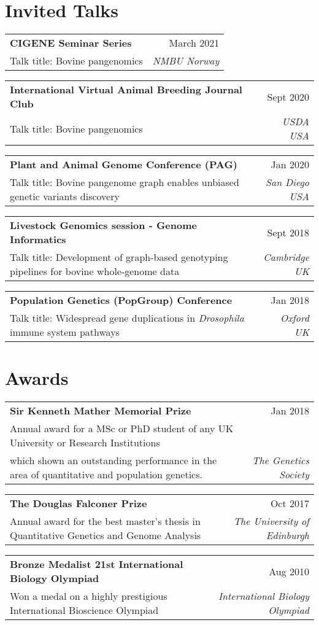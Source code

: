 \documentclass[letterpaper,10pt]{article}
\makeatletter
\newcommand{\resumetalk}[4]{\small{
  \vspace{-2pt}\item
    \begin{tabular*}{0.97\textwidth}[t]{l@{\extracolsep{\fill}}r}
      \textbf{#1} & #2 \\
      \small#3 & \textit{\small #4} \\
    \end{tabular*}\vspace{-4pt}
    }
}
\newcommand{\resumeSubHeadingListStart}{\begin{itemize}[leftmargin=0.15in, label={}]}
\newcommand{\resumeSubHeadingListEnd}{\end{itemize}}
\makeatother
\begin{document}
\section{Invited Talks}
   
 \resumeSubHeadingListStart
 \small{
 
    \resumetalk {CIGENE Seminar Series}{March 2021}
      {Talk title: Bovine pangenomics}{NMBU Norway}
      \resumetalk {International Virtual Animal Breeding Journal Club}{Sept 2020}
      {Talk title: Bovine pangenomics}{USDA USA}
   \resumetalk {Plant and Animal Genome Conference (PAG)}{Jan 2020}
      {Talk title: Bovine pangenome graph enables unbiased genetic variants discovery}{San Diego USA}
      
  \resumetalk {Livestock Genomics session - Genome Informatics}{Sept 2018}
     {Talk title: Development of graph-based genotyping pipelines for bovine whole-genome data}{Cambridge UK}
     
    \resumetalk {Population Genetics (PopGroup) Conference }{Jan 2018}
     {Talk title: Widespread gene duplications in \textit{Drosophila} immune system pathways}{Oxford UK}
     
      
    }
\resumeSubHeadingListEnd
    
\section{Awards}
   
 \resumeSubHeadingListStart
 \small{
 
    \resumetalk {Sir Kenneth Mather Memorial Prize}{Jan 2018}
      {Annual award for a MSc or PhD student of any UK University or Research Institutions \\ which shown an outstanding performance in the area of quantitative and population genetics. }{The Genetics Society}
    \resumetalk {The Douglas Falconer Prize }{Oct 2017}
      {Annual award for the best master’s thesis in Quantitative Genetics and Genome Analysis}{The University of Edinburgh}
   \resumetalk {Bronze Medalist 21st International Biology Olympiad}{Aug 2010}
      {Won a medal on a highly prestigious International Bioscience Olympiad}{International Biology Olympiad}
     
      
    }
\resumeSubHeadingListEnd
\end{document}
